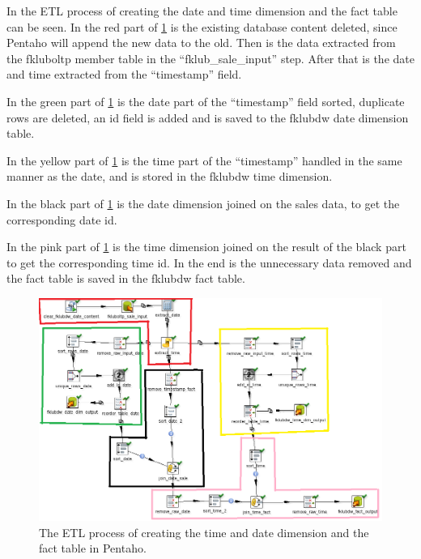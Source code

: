 In  the ETL process of creating the date and time dimension and the fact table can be seen.
In the red part of \cref{fig:etl-process2} is the existing database content deleted, since Pentaho will append the new data to the old.
Then is the data extracted from the fkluboltp member table in the ``fklub\_sale\_input'' step.
After that is the date and time extracted from the ``timestamp'' field.

In the green part of \cref{fig:etl-process2} is the date part of the ``timestamp'' field sorted, duplicate rows are deleted, an id field is added and is saved to the fklubdw date dimension table. 

In the yellow part of \cref{fig:etl-process2} is the time part of the ``timestamp'' handled in the same manner as the date, and is stored in the fklubdw time dimension.

In the black part of \cref{fig:etl-process2} is the date dimension joined on the sales data, to get the corresponding date id.

In the pink part of \cref{fig:etl-process2} is the time dimension joined on the result of the black part to get the corresponding time id.
In the end is the unnecessary data removed and the fact table is saved in the fklubdw fact table. 

\begin{figure}[H]
    \centering
    \includegraphics[width=1.0\textwidth]{img/date_time_fact.png}
    \caption{The ETL process of creating the time and date dimension and the fact table in Pentaho.}
    \label{fig:etl-process2}
\end{figure}
